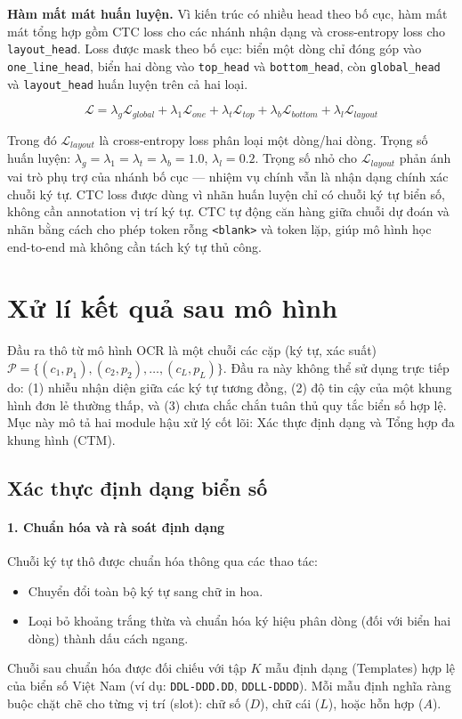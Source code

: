 \documentclass[../DoAn.tex]{subfiles}
\begin{document}
\textbf{Hàm mất mát huấn luyện.}
Vì kiến trúc có nhiều head theo bố cục, hàm mất mát tổng hợp gồm CTC loss cho các nhánh nhận dạng và cross-entropy loss cho \texttt{layout\_head}. Loss được mask theo bố cục: biển một dòng chỉ đóng góp vào \texttt{one\_line\_head}, biển hai dòng vào \texttt{top\_head} và \texttt{bottom\_head}, còn \texttt{global\_head} và \texttt{layout\_head} huấn luyện trên cả hai loại.

\[
\mathcal{L} = \lambda_g \mathcal{L}_{global} + \lambda_1 \mathcal{L}_{one} + \lambda_t \mathcal{L}_{top} + \lambda_b \mathcal{L}_{bottom} + \lambda_l \mathcal{L}_{layout}
\]

Trong đó $\mathcal{L}_{layout}$ là cross-entropy loss phân loại một dòng/hai dòng. Trọng số huấn luyện: $\lambda_g = \lambda_1 = \lambda_t = \lambda_b = 1.0$, $\lambda_l = 0.2$. Trọng số nhỏ cho $\mathcal{L}_{layout}$ phản ánh vai trò phụ trợ của nhánh bố cục — nhiệm vụ chính vẫn là nhận dạng chính xác chuỗi ký tự. CTC loss được dùng vì nhãn huấn luyện chỉ có chuỗi ký tự biển số, không cần annotation vị trí ký tự. CTC tự động căn hàng giữa chuỗi dự đoán và nhãn bằng cách cho phép token rỗng \texttt{\textless blank\textgreater} và token lặp, giúp mô hình học end-to-end mà không cần tách ký tự thủ công.

\section{Xử lí kết quả sau mô hình}
\label{section:3.4}

Đầu ra thô từ mô hình OCR là một chuỗi các cặp (ký tự, xác suất) $\mathcal{P} = \{(c_1, p_1), \allowbreak (c_2, p_2), \allowbreak \dots, \allowbreak (c_L, p_L)\}$. Đầu ra này không thể sử dụng trực tiếp do: (1) nhiễu nhận diện giữa các ký tự tương đồng, (2) độ tin cậy của một khung hình đơn lẻ thường thấp, và (3) chưa chắc chắn tuân thủ quy tắc biển số hợp lệ. Mục này mô tả hai module hậu xử lý cốt lõi: Xác thực định dạng và Tổng hợp đa khung hình (CTM).

\subsection{Xác thực định dạng biển số}
\label{subsection:3.4.1}

\paragraph{1. Chuẩn hóa và rà soát định dạng}
Chuỗi ký tự thô được chuẩn hóa thông qua các thao tác:
\begin{itemize}
    \item Chuyển đổi toàn bộ ký tự sang chữ in hoa.
    \item Loại bỏ khoảng trắng thừa và chuẩn hóa ký hiệu phân dòng (đối với biển hai dòng) thành dấu cách ngang.
\end{itemize}
Chuỗi sau chuẩn hóa được đối chiếu với tập $K$ mẫu định dạng (Templates) hợp lệ của biển số Việt Nam (ví dụ: \texttt{DDL-DDD.DD}, \texttt{DDLL-DDDD}). Mỗi mẫu định nghĩa ràng buộc chặt chẽ cho từng vị trí (slot): chữ số ($D$), chữ cái ($L$), hoặc hỗn hợp ($A$).
\end{document}
